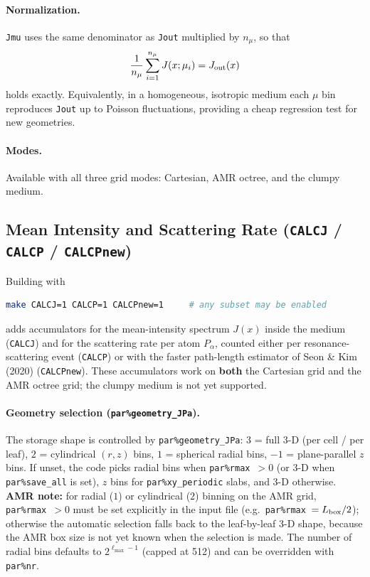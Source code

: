 \documentclass[english,a4paper]{my_memo}
\newcommand{\parm}[1]{\texttt{par\%#1}}
\begin{document}
\paragraph{Normalization.}
\texttt{Jmu} uses the same denominator as \texttt{Jout} multiplied by
$n_\mu$, so that
\begin{equation}
  \frac{1}{n_\mu}\sum_{i=1}^{n_\mu} J(x;\mu_i) = J_{\rm out}(x)
\end{equation}
holds exactly.  Equivalently, in a homogeneous, isotropic medium each
$\mu$ bin reproduces \texttt{Jout} up to Poisson fluctuations, providing
a cheap regression test for new geometries.

\paragraph{Modes.} Available with all three grid modes:
Cartesian, AMR octree, and the clumpy medium.

\subsection{Mean Intensity and Scattering Rate
            (\texttt{CALCJ} / \texttt{CALCP} / \texttt{CALCPnew})}
\label{sec:calcjp}

Building with
\begin{lstlisting}[language=bash,numbers=none]
make CALCJ=1 CALCP=1 CALCPnew=1     # any subset may be enabled
\end{lstlisting}
adds accumulators for the mean-intensity spectrum $J(x)$ inside the medium
(\texttt{CALCJ}) and for the scattering rate per atom $P_\alpha$, counted
either per resonance-scattering event (\texttt{CALCP}) or with the faster
path-length estimator of Seon \& Kim (2020) (\texttt{CALCPnew}).  These
accumulators work on \textbf{both} the Cartesian grid and the AMR octree
grid; the clumpy medium is not yet supported.

\paragraph{Geometry selection (\parm{geometry\_JPa}).}
The storage shape is controlled by \parm{geometry\_JPa}: $3$ = full 3-D
(per cell / per leaf), $2$ = cylindrical $(r, z)$ bins, $1$ = spherical
radial bins, $-1$ = plane-parallel $z$ bins.  If unset, the code picks
radial bins when \parm{rmax}~$>0$ (or 3-D when \parm{save\_all} is set),
$z$ bins for \parm{xy\_periodic} slabs, and 3-D otherwise.
\textbf{AMR note:} for radial ($1$) or cylindrical ($2$) binning on the AMR
grid, \parm{rmax}~$>0$ must be set explicitly in the input file (e.g.\
\parm{rmax}~$= L_{\rm box}/2$); otherwise the automatic selection falls back
to the leaf-by-leaf 3-D shape, because the AMR box size is not yet known when the
selection is made.  The number of radial bins defaults to
$2^{\ell_{\max}-1}$ (capped at 512) and can be overridden with \parm{nr}.
\end{document}
